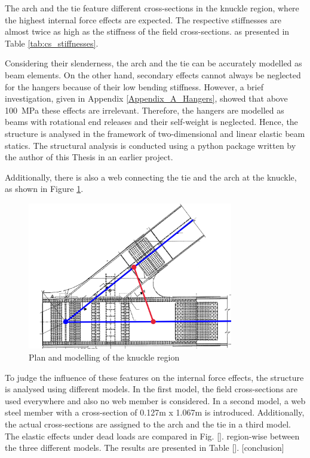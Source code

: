 The arch and the tie feature different cross-sections in the knuckle region, where the highest internal force effects are expected. The respective stiffnesses are almost twice as high as the stiffness of the field cross-sections.  as presented in Table \ref{tab:cs_stiffnesses}.

Considering their slenderness, the arch and the tie can be accurately modelled as beam elements. On the other hand, secondary effects cannot always be neglected for the hangers because of their low bending stiffness. However, a brief investigation, given in Appendix \ref{Appendix_A_Hangers}, showed that above \SI{100}{MPa} these effects are irrelevant. Therefore, the hangers are modelled as beams with rotational end releases and their self-weight is neglected. Hence, the structure is analysed in the framework of two-dimensional and linear elastic beam statics. The structural analysis is conducted using a python package written by the author of this Thesis in an earlier project.\bigskip


Additionally, there is also a web connecting the tie and the arch at the knuckle, as shown in Figure \ref{fig:knuckle_region}.



\begin{figure}[H]
    \centering
    \includegraphics[width=0.8\textwidth]{overleaf/Pictures/Knuckle region.png}
    \caption{Plan and modelling of the knuckle region}
    \label{fig:knuckle_region}
\end{figure}

To judge the influence of these features on the internal force effects, the structure is analysed using different models. In the first model, the field cross-sections are used everywhere and also no web member is considered. In a second model, a web steel member with a cross-section of 0.127m x 1.067m is introduced. Additionally, the actual cross-sections are assigned to the arch and the tie in a third model. The elastic effects under dead loads are compared in Fig. [].
region-wise between the three different models. The results are presented in Table []. [conclusion]

